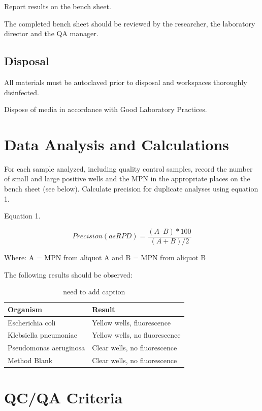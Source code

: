\documentclass[12pt]{../SOP4_alpha}\usepackage[]{graphicx}\usepackage[]{xcolor}
\begin{document}
\NP Report results on the bench sheet.

\NP The completed bench sheet should be reviewed by the researcher, the
laboratory director and the QA manager. 

\subsection{Disposal}


\NP All materials must be autoclaved prior to disposal and workspaces
thoroughly disinfected.

\NP Dispose of media in accordance with Good Laboratory Practices.

\section{Data Analysis and Calculations}

\NP For each sample analyzed, including quality control samples, record
the number of small and large positive wells and the MPN in the
appropriate places on the bench sheet (see below). Calculate
precision for duplicate analyses using equation 1.

\NP Equation 1. 

\begin{equation}
Precision (as RPD) = \frac{(A – B)*100}{(A + B)/2}
\end{equation}

Where: A = MPN from aliquot A and
 B = MPN from aliquot B 

\NP The following results should be observed:


\begin{table}
\caption{need to add caption}
		\begin{tabular}{ll}\hline

Organism                &  Result \\ \hline \hline
Escherichia coli        & Yellow wells, fluorescence \\
Klebsiella pneumoniae   & Yellow wells, no fluorescence \\
Pseudomonas aeruginosa  & Clear wells, no fluorescence \\
Method Blank            & Clear wells, no fluorescence \\ \hline
  \end{tabular}
\end{table}


\section{QC/QA Criteria}
\end{document}
